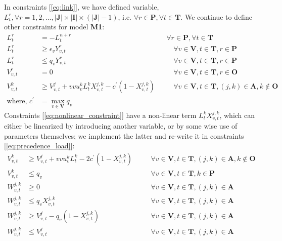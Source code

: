 \documentclass[11pt,letter]{article}
\begin{document}
In constraints [\ref{eq:link}], we have defined variable, $L_{t}^{r}, \forall r=1,2,\ldots,|\textbf{J}|\times|\textbf{I}|\times(|\textbf{J}|-1)$, i.e. $\forall r \in \textbf{P}, \forall t \in \textbf{T}$. We continue to define other constraints for model \textbf{M1}:
\begin{align}
L_{t}^{r} & = -L_{t}^{n+r} && \forall r \in \textbf{P}, \forall t \in \textbf{T} \label{eq:Fig3_2} \\
L_{t}^{r} & \geq \epsilon_v Y_{v,t}^{r} && \quad \forall v \in \textbf{V}, t \in \textbf{T}, r \in \textbf{P} \\
L_{t}^{r} & \leq q_v Y_{v,t}^{r} && \quad \forall v \in \textbf{V}, t \in \textbf{T}, r \in \textbf{P} \\
V_{v,t}^{r} & = 0 && \quad \forall v \in \textbf{V}, t \in \textbf{T}, r \in \textbf{O} \\
V_{v,t}^{k} & \geq V_{v,t}^{j}+vvu_{v}^{k} L_{t}^{k} X_{v,t}^{j,k}-c^{'} (1-X_{v,t}^{j,k}) && \quad \forall v \in \textbf{V}, t \in \textbf{T}, (j,k) \in \textbf{A}, k \not \in \textbf{O} \label{eq:nonlinear_constraint} \\
\text{where, } c^{'} & = \max_{v \in \textbf{V}} q_v \nonumber
\end{align}
Constraints [\ref{eq:nonlinear_constraint}] have a non-linear term $L_{t}^{k} X_{v,t}^{j,k}$, which can either be linearized by introducing another variable, or by some wise use of parameters themselves; we implement the latter and re-write it in constraints [\ref{eq:precedence_load}]:
\begin{align}
V_{v,t}^{k} & \geq V_{v,t}^{j}+vvu_{v}^{k} L_{t}^{k} -2c^{'} (1-X_{v,t}^{j,k}) && \quad \forall v \in \textbf{V}, t \in \textbf{T}, (j,k) \in \textbf{A}, k \not \in \textbf{O} \label{eq:precedence_load} \\
V_{v,t}^{k} & \leq q_v && \quad \forall v \in \textbf{V}, t \in \textbf{T}, k \in \textbf{P} \\
W_{v,t}^{j,k} & \geq 0 && \quad \forall v \in \textbf{V}, t \in \textbf{T}, (j,k) \in \textbf{A} \\
W_{v,t}^{j,k} & \leq q_v X_{v,t}^{j,k} && \quad \forall v \in \textbf{V}, t \in \textbf{T}, (j,k) \in \textbf{A} \\
W_{v,t}^{j,k} & \geq V_{v,t}^{j} -q_v (1-X_{v,t}^{j,k}) && \quad \forall v \in \textbf{V}, t \in \textbf{T}, (j,k) \in \textbf{A} \\
W_{v,t}^{j,k} & \leq V_{v,t}^{j} && \quad \forall v \in \textbf{V}, t \in \textbf{T}, (j,k) \in \textbf{A}
\end{align}
\end{document}

